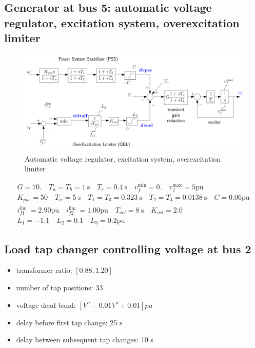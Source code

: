 \documentclass[a4paper,11pt,oneside,onecolumn]{article}
\begin{document}
\subsection{Generator at bus 5: automatic voltage regulator, excitation system, overexcitation limiter}

\begin{figure}[H]
	\centering
	\includegraphics[width=1\linewidth]{AVR}
	\caption{Automatic voltage regulator, excitation system, overexcitation limiter}
	\label{fig:avr}
\end{figure}

$$
\begin{gathered}
	G=70 . \quad T_a=T_b=1 \mathrm{~s} \quad T_e=0.4 \mathrm{~s} \quad v_f^{\min }=0 . \quad v_f^{\max }=5 \mathrm{pu} \\
	K_{p s s}=50 \quad T_w=5 \mathrm{~s} \quad T_1=T_3=0.323 \mathrm{~s} \quad T_2=T_4=0.0138 \mathrm{~s} \quad C=0.06 \mathrm{pu} \\
	i_{f 1}^{\text {lim }}=2.90 \mathrm{pu} \quad i_{f 2}^{\text {lim }}=1.00 \mathrm{pu} \quad T_{o e l}=8 \mathrm{~s} \quad K_{o e l}=2.0 \\
	L_1=-1.1 \quad L_2=0.1 \quad L_3=0.2 \mathrm{pu}
\end{gathered}
$$

\subsection{Load tap changer controlling voltage at bus 2}

\begin{itemize}
	\item transformer ratio: $\left[0.88, 1.20\right]$
	\item number of tap positions: 33
	\item voltage dead-band: $\left[V^o-0.01 V^o+0.01\right] pu$
	\item delay before first tap change: 25 s
	\item delay between subsequent tap changes: 10 s
\end{itemize}
\end{document}
